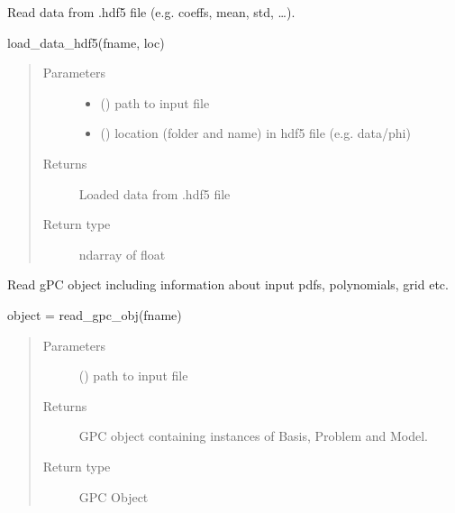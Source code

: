 \documentclass[letterpaper,10pt,english,openany,oneside]{sphinxmanual}
\begin{document}
\begin{fulllineitems}
\label{\detokenize{pygpc:pygpc.io.read_data_hdf5}}
Read data from .hdf5 file (e.g. coeffs, mean, std, …).

load\_data\_hdf5(fname, loc)
\begin{quote}\begin{description}
\item[{Parameters}] \leavevmode\begin{itemize}
\item {} 
 () \textendash{} path to input file

\item {} 
 () \textendash{} location (folder and name) in hdf5 file (e.g. data/phi)

\end{itemize}

\item[{Returns}] \leavevmode
{} \textendash{} Loaded data from .hdf5 file

\item[{Return type}] \leavevmode
ndarray of float

\end{description}\end{quote}

\end{fulllineitems}


\begin{fulllineitems}
\label{\detokenize{pygpc:pygpc.io.read_gpc_pkl}}
Read gPC object including information about input pdfs, polynomials, grid etc.

object = read\_gpc\_obj(fname)
\begin{quote}\begin{description}
\item[{Parameters}] \leavevmode
{} () \textendash{} path to input file

\item[{Returns}] \leavevmode
{} \textendash{} GPC object containing instances of Basis, Problem and Model.

\item[{Return type}] \leavevmode
GPC Object

\end{description}\end{quote}

\end{fulllineitems}
\end{document}
